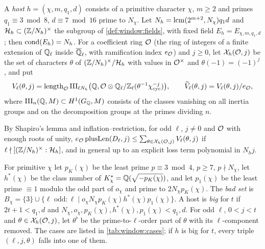 \begin{definition}\label{def:window:host}
A \emph{host} $h=(\chi,m,q_1,d)$ consists of a primitive character $\chi$, $m\ge2$ and primes $q_1\equiv3\bmod8$,
$d\equiv7\bmod16$ prime to $N_\chi$. Let $N_h=\operatorname{lcm}(2^{m+2},N_\chi)q_1d$ and $\mathcal{H}_h\subset(\mathbb{Z}/N_h)^\times$ the
subgroup of \cref{def:window:fields}, with fixed field $E_h=E_{\chi,m,q_1,d}$; then $\operatorname{cond}(E_h)=N_h$. For a
coefficient ring $\mathcal{O}$ (the ring of integers of a finite extension of $\mathbb{Q}_\ell$ inside $\overline{\mathbb{Q}}_\ell$, with ramification index
$e_{\mathcal{O}}$) and $j\ge0$, let $\mathcal{X}_h(\mathcal{O},j)$ be the set of characters $\theta$ of $(\mathbb{Z}/N_h)^\times/\mathcal{H}_h$ with
values in $\mathcal{O}^\times$ and $\theta(-1)=(-1)^j$, and put
\[
 V_\ell(\theta,j)=\operatorname{length}_{\mathcal{O}}\mathrm{III}_{\ell N_h}\bigl(\mathbb{Q},\mathcal{O}\otimes\mathbb{Q}_\ell/\mathbb{Z}_\ell(\theta^{-1}\chi_{\mathrm{cyc}}^{-j})\bigr),\qquad
 \widetilde V_\ell(\theta,j)=V_\ell(\theta,j)/e_{\mathcal{O}},
\]
where $\mathrm{III}_n(\mathbb{Q},M)\subset H^1(G_{\mathbb{Q}},M)$ consists of the classes vanishing on all inertia groups and on the
decomposition groups at the primes dividing $n$.
\end{definition}

By Shapiro's lemma and inflation--restriction, for odd $\ell$, $j\ne0$ and $\mathcal{O}$ with enough roots of unity,
$e_{\mathcal{O}}\,\mathrm{plusLen}(D_\ell,j)\le\sum_{\theta\in\mathcal{X}_h(\mathcal{O},j)}V_\ell(\theta,j)$ if
$\ell\nmid[(\mathbb{Z}/N_h)^\times:\mathcal{H}_h]$, and in general up to an explicit loss term polynomial in $N_hj$.

\begin{definition}\label{def:window:cases}
For primitive $\chi$ let $p_K(\chi)$ be the least prime $p\equiv3\bmod4$, $p\ge7$, $p\nmid N_\chi$, let $h^*(\chi)$ be
the class number of $K^*_\chi=\mathbb{Q}(\sqrt{-p_K(\chi)})$, and let $p_1(\chi)$ be the least prime $\equiv1$ modulo the odd
part of $o_\chi$ and prime to $2N_\chi p_K(\chi)$. The \emph{bad set} is
$B_\chi=\{3\}\cup\{\ell\text{ odd}:\ell\mid o_\chi N_\chi p_K(\chi)h^*(\chi)p_1(\chi)\}$. A host is \emph{big} for $t$ if
$2t+1<q_1,d$ and $N_\chi,o_\chi,p_K(\chi),h^*(\chi),p_1(\chi)<q_1,d$. For odd $\ell$, $0<j<t$ and
$\theta\in\mathcal{X}_h(\mathcal{O},j)$, let $\theta^\flat$ be the prime-to-$\ell$-order part of $\theta$ with its
$\ell$-component removed. The cases are listed in \cref{tab:window:cases}; if $h$ is big for $t$, every triple
$(\ell,j,\theta)$ falls into one of them.
\end{definition}

